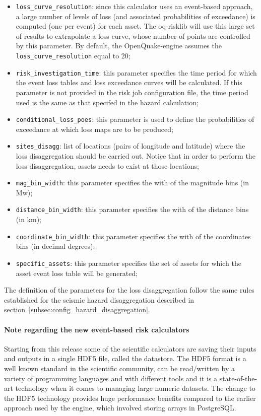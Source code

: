\begin{itemize}
\item \Verb+loss_curve_resolution+: since this calculator uses an event\--based ap\-proach, a large number of levels of loss (and associated probabilities of exceedance) is computed (one per event) for each asset. The oq-risklib will use this large set of results to extrapolate a loss curve, whose number of points are controlled by this parameter. By default, the OpenQuake-engine assumes the \Verb+loss_curve_resolution+ equal to 20;
\item  \Verb+risk_investigation_time+: this parameter specifies the time period for which the event loss tables and loss exceedance curves will be calculated. If this parameter is not provided in the risk job configuration file, the time period used is the same as that specifed in the hazard calculation;
\item  \Verb+conditional_loss_poes+: this parameter is used to define the probabilities of exceedance at which loss maps are to be produced;
\item  \Verb+sites_disagg+: list of locations (pairs of longitude and latitude) where the loss disaggregation should be carried out. Notice that in order to perform the loss disaggregation, assets needs to exist at those locations;
\item  \Verb+mag_bin_width+: this parameter specifies the with of the magnitude bins (in Mw);
\item  \Verb+distance_bin_width+: this parameter specifies the with of the distance bins (in km);
\item  \Verb+coordinate_bin_width+: this parameter specifies the with of the coordinates bins (in decimal degrees);
\item  \Verb+specific_assets+: this parameter specifies the set of assets for which the asset event loss table will be generated;
\end{itemize}

The definition of the parameters for the loss disaggregation follow the same rules established for the seismic hazard disaggregation described in section~\ref{subsec:config_hazard_disaggregation}.

\paragraph{Note regarding the new event-based risk calculators}

Starting from this release some of the scientific calculators are saving their inputs and outputs in a single HDF5 file, called the datastore. The HDF5 format is a well known standard in the scientific community, can be read/written by a variety of programming languages and with different tools and it is a state-of-the-art technology when it comes to managing large numeric datasets. The change to the HDF5 technology provides huge performance benefits compared to the earlier approach used by the engine, which involved storing arrays in PostgreSQL.

